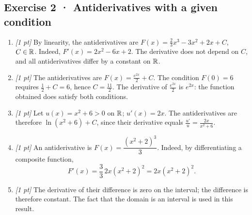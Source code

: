 \subsection*{Exercise 2 · Antiderivatives with a given condition}\begin{enumerate}

\item \textit{[1 pt]} By linearity, the antiderivatives are $F(x)=\frac{2}{3}x^3-3x^2+2x+C$, $C\in\mathbb R$. Indeed, $F'(x)=2x^2-6x+2$. The derivative does not depend on $C$, and all antiderivatives differ by a constant on $\mathbb R$.

\item \textit{[1 pt]} The antiderivatives are $F(x)=\frac{e^{2x}}{2}+C$. The condition $F(0)=6$ requires $\frac{1}{2}+C=6$, hence $C=\frac{11}{2}$. The derivative of $\frac{e^{2x}}{2}$ is $e^{2x}$: the function obtained does satisfy both conditions.

\item \textit{[1 pt]} Let $u(x)=x^2+6>0$ on $\mathbb R$; $u'(x)=2x$. The antiderivatives are therefore $\ln(x^2+6)+C$, since their derivative equals $\frac{u'}{u}=\frac{2x}{x^2+6}$.

\item \textit{[1 pt]} An antiderivative is $F(x)=\dfrac{(x^2+2)^{3}}{3}$. Indeed, by differentiating a composite function,
\[F'(x)=\frac{3}{3}\,2x(x^2+2)^{2}=2x(x^2+2)^{2}.\]

\item \textit{[1 pt]} The derivative of their difference is zero on the interval; the difference is therefore constant. The fact that the domain is an interval is used in this result.

\end{enumerate}

